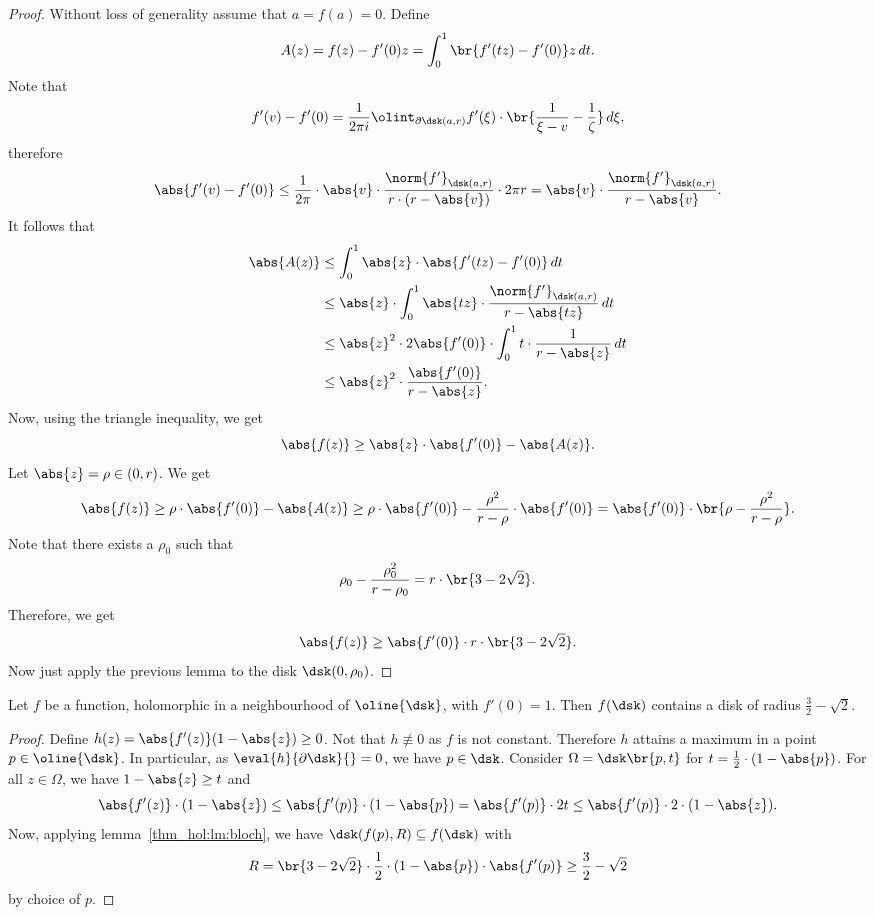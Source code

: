 \begin{proof}
Without loss of generality assume that $a = f(a) = 0$. Define
\[
A(z) = f(z) - f'(0) z = \int_0^1 \br{f'(tz) - f'(0)} z \,dt.
\]
Note that
\[
f'(v) - f'(0) =
\frac{1}{2 \pi i} \olint_{\partial \dsk(a, r)}
f'(\xi) \cdot \br{\frac{1}{\xi-v} - \frac{1}{\zeta}}\,d\xi,
\]
therefore
\[
\abs{f'(v) - f'(0)} \leq
\frac{1}{2 \pi} \cdot \abs{v} \cdot
\frac{\norm{f'}_{\dsk(a,r)}}{r \cdot (r - \abs{v})} \cdot 2 \pi r =
\abs{v} \cdot \frac{\norm{f'}_{\dsk(a,r)}}{r - \abs{v}}.
\]
It follows that
\begin{align*}
\abs{A(z)} &\leq
\int_0^1 \abs{z} \cdot \abs{f'(tz) - f'(0)}\,dt
\\
&\leq
\abs{z} \cdot \int_0^1
\abs{tz} \cdot \frac{\norm{f'}_{\dsk(a,r)}}{r - \abs{tz}}\,dt
\\
&\leq
\abs{z}^2 \cdot 2 \abs{f'(0)} \cdot \int_0^1
t \cdot \frac{1}{r - \abs{z}}\,dt
\\
&\leq
\abs{z}^2 \cdot \frac{\abs{f'(0)}}{r - \abs{z}}.
\end{align*}
Now, using the triangle inequality, we get
\[
\abs{f(z)} \geq \abs{z} \cdot \abs{f'(0)} - \abs{A(z)}.
\]
Let $\abs{z} = \rho \in (0, r)$. We get
\[
\abs{f(z)} \geq
\rho \cdot \abs{f'(0)} - \abs{A(z)} \geq
\rho \cdot \abs{f'(0)} -
\frac{\rho^2}{r - \rho} \cdot \abs{f'(0)} =
\abs{f'(0)} \cdot \br{\rho - \frac{\rho^2}{r - \rho}}.
\]
Note that there exists a $\rho_0$ such that
\[
\rho_0 - \frac{\rho_0^2}{r - \rho_0} =
r \cdot \br{3 - 2 \sqrt{2}}.
\]
Therefore, we get
\[
\abs{f(z)} \geq \abs{f'(0)} \cdot r \cdot \br{3 - 2 \sqrt{2}}.
\]
Now just apply the previous lemma to the disk $\dsk(0, \rho_0)$.
\end{proof}

\begin{izrek}[Bloch]
Let $f$ be a function, holomorphic in a neighbourhood of
$\oline{\dsk}$, with $f'(0) = 1$. Then $f(\dsk)$ contains a disk of
radius $\frac{3}{2} - \sqrt{2}$.
\end{izrek}


\begin{proof}
Define $h(z) = \abs{f'(z)} (1-\abs{z}) \geq 0$. Not that
$h \not \equiv 0$ as $f$ is not constant. Therefore $h$ attains a
maximum in a point $p \in \oline{\dsk}$. In particular, as
$\eval{h}{\partial \dsk}{} = 0$, we have $p \in \dsk$. Consider
$\Omega = \dsk \br{p, t}$ for
$t = \frac{1}{2} \cdot (1 - \abs{p})$.
For all $z \in \Omega$, we have $1 - \abs{z} \geq t$ and
\[
\abs{f'(z)} \cdot (1 - \abs{z}) \leq
\abs{f'(p)} \cdot (1 - \abs{p}) =
\abs{f'(p)} \cdot 2t \leq
\abs{f'(p)} \cdot 2 \cdot (1 - \abs{z}).
\]
Now, applying lemma~\ref{thm_hol:lm:bloch}, we have
$\dsk(f(p), R) \subseteq f(\dsk)$ with
\[
R =
\br{3 - 2 \sqrt{2}} \cdot \frac{1}{2}
\cdot (1 - \abs{p}) \cdot \abs{f'(p)} \geq
\frac{3}{2} - \sqrt{2}
\]
by choice of $p$.
\end{proof}

